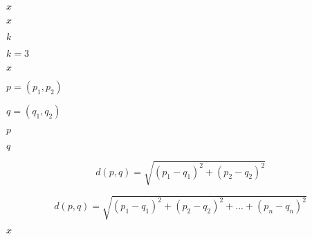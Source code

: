 \documentclass[10pt]{book}
\begin{document}
\begin{mdSnippets}
\begin{mdInlineSnippet}[9dd4e461268c8034f5c8564e155c67a6]%
$x$\end{mdInlineSnippet}%
\begin{mdInlineSnippet}[9dd4e461268c8034f5c8564e155c67a6]%
$x$\end{mdInlineSnippet}%
\begin{mdInlineSnippet}[8ce4b16b22b58894aa86c421e8759df3]%
$k$\end{mdInlineSnippet}%
\begin{mdInlineSnippet}[d425c55d57cd55fcab081d411d30c5a4]%
$k = 3$\end{mdInlineSnippet}%
\begin{mdInlineSnippet}[9dd4e461268c8034f5c8564e155c67a6]%
$x$\end{mdInlineSnippet}%
\begin{mdInlineSnippet}[efbcdd110be134c6f49a7305ac17f4a6]%
$p = (p_1, p_2)$\end{mdInlineSnippet}%
\begin{mdInlineSnippet}[72d63d5b07b35f16409b11f10b332243]%
$q = (q_1, q_2)$\end{mdInlineSnippet}%
\begin{mdInlineSnippet}[83878c91171338902e0fe0fb97a8c47a]%
$p$\end{mdInlineSnippet}%
\begin{mdInlineSnippet}[7694f4a66316e53c8cdd9d9954bd611d]%
$q$\end{mdInlineSnippet}%
\begin{mdDisplaySnippet}%
\[%
d(p,q) = \sqrt{(p_1 - q_1)^2 + (p_2 - q_2)^2}
\]%
\end{mdDisplaySnippet}%
\begin{mdDisplaySnippet}[15d99a16555ce3719bf621bf24ee8234]%
\[%
d(p,q) = \sqrt{(p_1 - q_1)^2 + (p_2 - q_2)^2 + ... + (p_n - q_n)^2}
\]%
\end{mdDisplaySnippet}%
\begin{mdInlineSnippet}[9dd4e461268c8034f5c8564e155c67a6]%
$x$\end{mdInlineSnippet}%

\end{mdSnippets}
\end{document}
